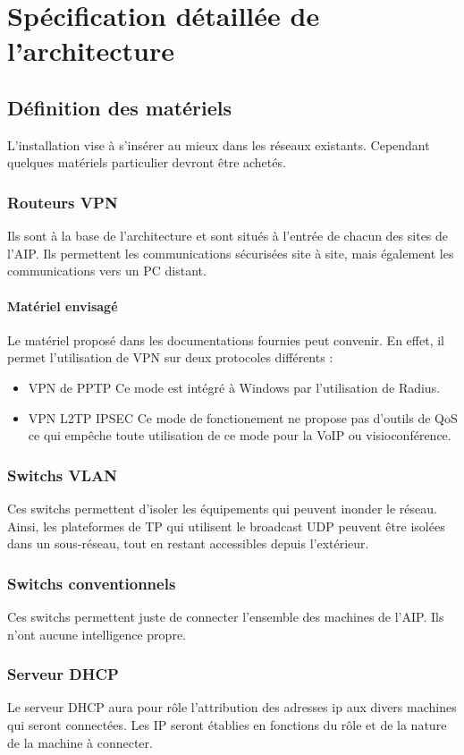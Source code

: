 \documentclass[a4paper]{article}
\begin{document}
\section{Spécification détaillée de l'architecture}
	\subsection{Définition des matériels}
	L'installation vise à s'insérer au mieux dans les réseaux existants. Cependant quelques matériels particulier devront être achetés.
	\subsubsection{Routeurs VPN}
Ils sont à la base de l'architecture et sont situés à l'entrée de chacun des sites de l'AIP.
Ils permettent les communications sécurisées site à site, mais également les communications vers un PC distant.
\paragraph{Matériel envisagé}
Le matériel proposé dans les documentations fournies peut convenir. En effet, il permet l'utilisation de VPN sur deux protocoles différents : 
\begin{itemize}
	\item{VPN de PPTP} Ce mode est intégré à Windows par l'utilisation de Radius.
	\item{VPN L2TP IPSEC} Ce mode de fonctionement ne propose pas d'outils de QoS ce qui empêche toute utilisation de ce mode pour la VoIP ou visioconférence.
\end{itemize}

	\subsubsection{Switchs VLAN}
Ces switchs permettent d'isoler les équipements qui peuvent inonder le réseau. Ainsi, les plateformes de TP qui utilisent le broadcast UDP peuvent être isolées dans un sous-réseau, tout en restant accessibles depuis l'extérieur.
	
	\subsubsection{Switchs conventionnels}
Ces switchs permettent juste de connecter l'ensemble des machines de l'AIP. Ils n'ont aucune intelligence propre.
	
	\subsubsection{Serveur DHCP}
Le serveur DHCP aura pour rôle l'attribution des adresses ip aux divers machines qui seront connectées. Les IP seront établies en fonctions du rôle et de la nature de la machine à connecter.
\end{document}
